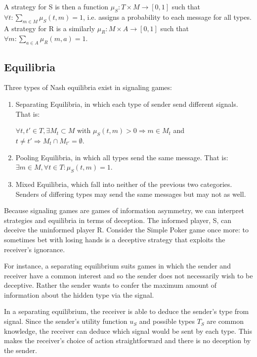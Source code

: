 \documentclass{article}
\begin{document}
A strategy for S is then a function $\mu_{S}: T \times M \to [0,1]$ such that $\forall t: \sum_{m \in M} \mu_{S}(t, m) = 1$, i.e. assigns a probability to each message for all types. A strategy for R is a similarly $\mu_{R} : M \times A \to [0,1]$ such that $\forall m: \sum_{a \in A} \mu_{R}(m,a) = 1$.

\subsection{Equilibria}

Three types of Nash equilibria exist in signaling games:

\begin{enumerate}
\item Separating Equilibria, in which each type of sender send different signals. That is:

$\forall t, t' \in T, \exists M_{t} \subset M$ with $\mu_S(t,m) > 0 \Rightarrow m \in M_{t}$ and $t \ne t' \Rightarrow M_{t} \cap M_{t'} = \emptyset$.

\item Pooling Equilibria, in which all types send the same message. That is: $\exists  m \in M, \forall t \in T : \mu_S(t,m) = 1$.

\item Mixed Equilibria, which fall into neither of the previous two categories. Senders of differing types may send the same messages but may not as well. 
\end{enumerate}

Because signaling games are games of information asymmetry, we can interpret strategies and equilibria in terms of deception. The informed player, S, can deceive the uninformed player R. Consider the Simple Poker game once more: to sometimes bet with losing hands is a deceptive strategy that exploits the receiver's ignorance. 

 For instance, a separating equilibrium suits games in which the sender and receiver have a common interest and so the sender does not necessarily wish to be deceptive. Rather the sender wants to confer the maximum amount of information about the hidden type via the signal.

In a separating equilibrium, the receiver is able to deduce the sender's type from signal. Since the sender's utility function $u_{S}$ and possible types $T_S$ are common knowledge, the receiver can deduce which signal would be sent by each type. This makes the receiver's choice of action straightforward and there is no deception by the sender.
\end{document}
